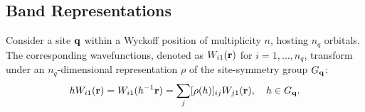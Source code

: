 \documentclass[12pt]{report}
\begin{document}




\subsection{Band Representations} \label{subsec:band_reps}

Consider a site \({\vb{q}}\) within a Wyckoff position of multiplicity \(n\), hosting \(n_q\) orbitals. The corresponding wavefunctions, denoted as \(W_{i1}({\vb{r}})\) for \(i = 1, \ldots, n_q\), transform under an \(n_q\)-dimensional representation \(\rho\) of the site-symmetry group \(G_{\vb{q}}\):
\begin{equation} \label{eq:gWi1_nq_rep}
h W_{i1}({\vb{r}}) = W_{i1}(h^{-1} {\vb{r}}) = \sum_{j} [\rho(h)]_{ij} W_{j1}({\vb{r}}), \quad h \in G_{\vb{q}}.
\end{equation}
\end{document}

